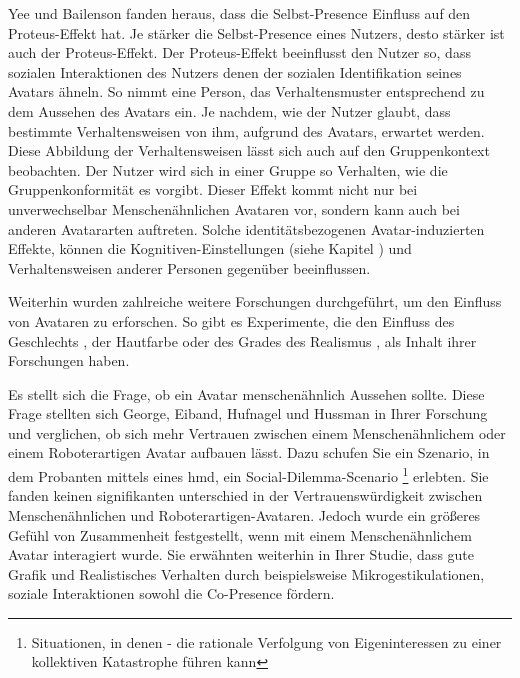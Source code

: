 \documentclass[a4paper,11pt]{article}%
\renewcommand{\\}{\vspace*{0.5\baselineskip} \newline}
\begin{document}
Yee und Bailenson fanden heraus, dass die Selbst-Presence Einfluss auf den Proteus-Effekt hat. Je stärker die Selbst-Presence eines Nutzers, desto stärker ist auch der Proteus-Effekt. Der Proteus-Effekt beeinflusst den Nutzer so, dass sozialen Interaktionen des Nutzers denen der sozialen Identifikation seines Avatars ähneln. So nimmt eine Person, das Verhaltensmuster entsprechend zu dem Aussehen des Avatars ein. Je nachdem, wie der Nutzer glaubt, dass bestimmte Verhaltensweisen von ihm, aufgrund des Avatars, erwartet werden. \citep{ratan2015leveling} 
Diese Abbildung der Verhaltensweisen lässt sich auch auf den Gruppenkontext beobachten. Der Nutzer wird sich in einer Gruppe so Verhalten, wie die Gruppenkonformität es vorgibt.
Dieser Effekt kommt nicht nur bei unverwechselbar Menschenähnlichen Avataren vor, sondern kann auch bei anderen Avatararten auftreten. Solche identitätsbezogenen Avatar-induzierten Effekte, können die \dq{}Kognitiven-Einstellungen\dq{} (siehe Kapitel \textit{}) und Verhaltensweisen anderer Personen gegenüber beeinflussen. \citep{lok2003effects}

Weiterhin wurden zahlreiche weitere Forschungen durchgeführt, um den Einfluss von Avataren zu erforschen. So gibt es Experimente, die den Einfluss des Geschlechts \cite{slater2010first}, der Hautfarbe \cite{peck2013putting} oder des Grades des Realismus \cite{roth2016avatar}, als Inhalt ihrer Forschungen haben.

Es stellt sich die Frage, ob ein Avatar menschenähnlich Aussehen sollte. Diese Frage stellten sich George, Eiband, Hufnagel und Hussman \cite{george2018trusting} in Ihrer Forschung und verglichen, ob sich mehr Vertrauen zwischen einem Menschenähnlichem oder einem Roboterartigen Avatar aufbauen lässt.
Dazu schufen Sie ein Szenario, in dem Probanten mittels eines \ac{hmd}, ein Social-Dilemma-Scenario \footnote{Situationen, in denen - die rationale Verfolgung von Eigeninteressen zu einer kollektiven Katastrophe führen kann} erlebten. Sie fanden keinen signifikanten unterschied in der Vertrauenswürdigkeit zwischen Menschenähnlichen und Roboterartigen-Avataren. Jedoch wurde ein größeres Gefühl von Zusammenheit festgestellt, wenn mit einem Menschenähnlichem Avatar interagiert wurde. \citep{kerr1983motivation}
Sie erwähnten weiterhin in Ihrer Studie, dass gute Grafik und Realistisches Verhalten durch beispielsweise Mikrogestikulationen, soziale Interaktionen sowohl die Co-Presence fördern. \citep{george2018trusting}
\end{document}
